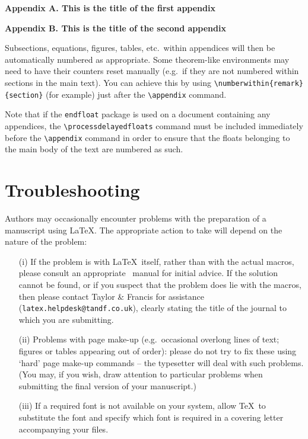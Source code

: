\documentclass[]{interact}
\theoremstyle{plain}%
\theoremstyle{definition}
\theoremstyle{remark}
\begin{document}
\noindent\textbf{Appendix A. This is the title of the first appendix}\medskip

\noindent\textbf{Appendix B. This is the title of the second appendix}\medskip

\noindent Subsections, equations, figures, tables, etc.\ within appendices will then be automatically numbered as appropriate. Some theorem-like environments may need to have their counters reset manually (e.g.\ if they are not numbered within sections in the main text). You can achieve this by using \verb"\numberwithin{remark}{section}" (for example) just after the \verb"\appendix" command.

Note that if the \verb"endfloat" package is used on a document containing any appendices, the \verb"\processdelayedfloats" command must be included immediately before the \verb"\appendix" command in order to ensure that the floats belonging to the main body of the text are numbered as such.


\appendix

\section{Troubleshooting}

Authors may occasionally encounter problems with the preparation of a manuscript using \LaTeX. The appropriate action to take will depend on the nature of the problem:
\begin{enumerate}
\item[(i)] If the problem is with \LaTeX\ itself, rather than with the actual macros, please consult an appropriate \LaTeXe\ manual for initial advice. If the solution cannot be found, or if you suspect that the problem does lie with the macros, then please contact Taylor \& Francis for assistance (\texttt{latex.helpdesk@tandf.co.uk}), clearly stating the title of the journal to which you are submitting.
\item[(ii)] Problems with page make-up (e.g.\ occasional overlong lines of text; figures or tables appearing out of order): please do not try to fix these using `hard' page make-up commands -- the typesetter will deal with such problems. (You may, if you wish, draw attention to particular problems when submitting the final version of your manuscript.)
\item[(iii)] If a required font is not available on your system, allow \TeX\ to substitute the font and specify which font is required in a covering letter accompanying your files.
\end{enumerate}
\end{document}
